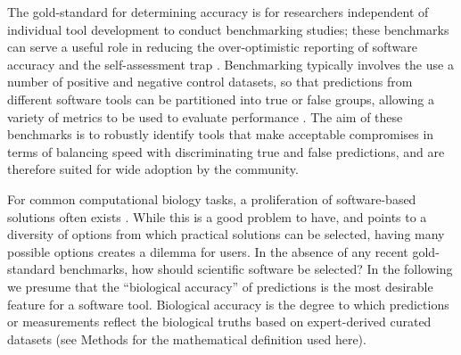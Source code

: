 \documentclass{bmcart}
\begin{document}
The gold-standard for determining accuracy is for researchers independent
of individual tool development to conduct benchmarking studies{\color{red};} these benchmarks can serve a useful role in
reducing the over-optimistic reporting of software accuracy
\cite{Boulesteix2010-te,Jelizarow2010-zf,Weber:2019} and the self-assessment trap
\cite{Norel2011-cq,Buchka:2021a}. Benchmarking typically involves the use a number of
positive and negative control datasets, so that predictions from different software tools can be
partitioned into true or false groups, allowing a variety of metrics to be
used to evaluate performance
\cite{Egan1975-nd,Hall2012-kg,Weber:2019}.
The aim of these benchmarks is to robustly identify tools that
make acceptable compromises in terms of balancing speed with
discriminating true and false predictions, and are therefore suited
for wide adoption by the community.

For common computational biology tasks, a proliferation of
software-based solutions often exists
\cite{Felsenstein1995-ic,Altschul2013-bv,Henry2014-ut}. While
this is a good problem to have, and points to a
diversity of options from which practical solutions can be selected,
having many possible options creates a dilemma for users. In the absence of
any recent gold-standard benchmarks, how should scientific software be
selected? In the following we presume that the ``biological
accuracy'' of predictions is the most desirable feature for a software tool. Biological
accuracy is the degree to which predictions or measurements reflect
the biological truths based on expert-derived curated datasets (see Methods for the  mathematical definition used here). 
\end{document}
